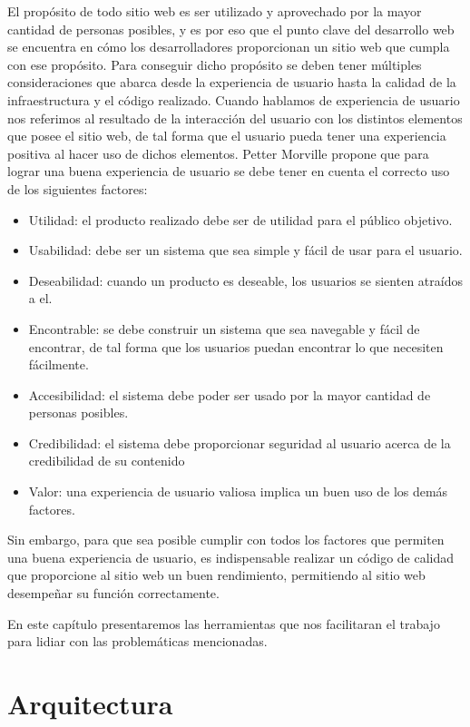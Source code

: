 El propósito de todo sitio web es ser utilizado y aprovechado por la mayor cantidad de personas posibles, y es por eso que el punto clave del desarrollo web se encuentra en cómo los desarrolladores proporcionan un sitio web que cumpla con ese propósito. Para conseguir dicho propósito se deben tener múltiples consideraciones que abarca desde la experiencia de usuario hasta la calidad de la infraestructura y el código realizado. Cuando hablamos de experiencia de usuario nos referimos al resultado de la interacción del usuario con los distintos elementos que posee el sitio web, de tal forma que el usuario pueda tener una experiencia positiva al hacer uso de dichos elementos. Petter Morville \cite{UXFactors} propone que para lograr una buena experiencia de usuario se debe tener en cuenta el correcto uso de los siguientes factores:

\begin{itemize}
  \item Utilidad: el producto realizado debe ser de utilidad para el público objetivo.
  \item Usabilidad: debe ser un sistema que sea simple y fácil de usar para el usuario.
  \item Deseabilidad: cuando un producto es deseable, los usuarios se sienten atraídos a el.
  \item Encontrable: se debe construir un sistema que sea navegable y fácil de encontrar, de tal forma que los usuarios puedan encontrar lo que necesiten fácilmente.
  \item Accesibilidad: el sistema debe poder ser usado por la mayor cantidad de personas posibles.
  \item Credibilidad: el sistema debe proporcionar seguridad al usuario acerca de la credibilidad de su contenido
  \item Valor: una experiencia de usuario valiosa implica un buen uso de los demás factores.
\end{itemize}

Sin embargo, para que sea posible cumplir con todos los factores que permiten una buena experiencia de usuario,
es indispensable realizar un código de calidad que proporcione al sitio web un buen rendimiento, permitiendo al sitio web
desempeñar su función correctamente.

En este capítulo presentaremos las herramientas que nos facilitaran el trabajo para lidiar con las problemáticas mencionadas.

\section{Arquitectura}

